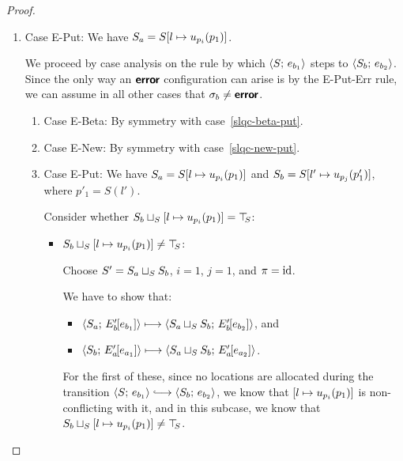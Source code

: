 \begin{proof}
\begin{enumerate}
\begin{enumerate}
    \end{enumerate}
  \item Case {\sc E-Put}: We have $S_a =
    S[l \mapsto u_{p_i}(p_1)]$.

    We proceed by case analysis on the rule by which
    $\langle S;\, e_{b_1} \rangle$ steps to $\langle S_b;\, e_{b_2} \rangle$.  Since the
    only way an $\textbf{\textsf{error}}$ configuration can arise is by the {\sc
      E-Put-Err} rule, we can assume in all other cases that $\sigma_b
    \neq \textbf{\textsf{error}}$.
    \begin{enumerate}
    \item \label{slqc-put-beta}Case {\sc E-Beta}: By symmetry with case~\ref{slqc-beta-put}.
    \item \label{slqc-put-new}Case {\sc E-New}: By symmetry with case~\ref{slqc-new-put}.
    \item \label{slqc-put-put}Case {\sc E-Put}: We have $S_a =
      S[l \mapsto u_{p_i}(p_1)]$ and $S_b =
      S[l' \mapsto u_{p_j}(p'_1)]$, where $p'_1 = S(l')$.

      Consider whether
      $S_b \sqcup_{S} \left[ l \mapsto u_{p_i}(p_1) \right]
      = \top\hspace{-0.85mm}_{S}$:

      \begin{itemize}
      \item
        $S_b \sqcup_{S} \left[ l \mapsto u_{p_i}(p_1) \right]
        \neq \top\hspace{-0.85mm}_{S}$:

        Choose $S' = S_a \sqcup_{S} S_b$, $i = 1$, $j = 1$, and $\pi =
        \mathrm{id}$.

        We have to show that:
        \begin{itemize}
        \item $\langle S_a;\, E'_b\hspace{-1mm}\left[e_{b_1}\right] \rangle \longmapsto
          \langle S_a \sqcup_{S} S_b;\, E'_b\hspace{-1mm}\left[e_{b_2}\right] \rangle$, and
        \item $\langle S_b;\, E'_a\hspace{-1mm}\left[e_{a_1}\right] \rangle \longmapsto
          \langle S_a \sqcup_{S} S_b;\, E'_a\hspace{-1mm}\left[e_{a_2}\right] \rangle$.
        \end{itemize}

        For the first of these, since no locations are allocated
        during the transition $\config{S}{e_{b_1}} \parstepsto
        \config{S_b}{e_{b_2}}$, we know that
        $\left[ l \mapsto u_{p_i}(p_1) \right]$ is
        non-conflicting with it, and in this subcase, we know that
        $S_b \sqcup_{S} \left[ l \mapsto u_{p_i}(p_1) \right]
        \neq \top\hspace{-0.85mm}_{S}$.



\end{itemize}
\end{enumerate}
\end{enumerate}
\end{proof}
